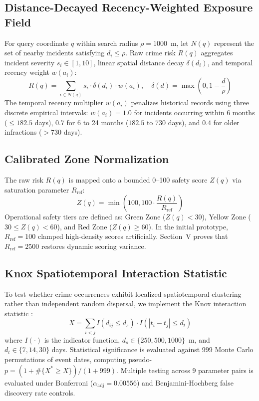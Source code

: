 \documentclass[conference]{IEEEtran}
\begin{document}
\subsection{Distance-Decayed Recency-Weighted Exposure Field}
For query coordinate $q$ within search radius $\rho = 1000$~m, let $N(q)$ represent the set of nearby incidents satisfying $d_i \le \rho$. Raw crime risk $R(q)$ aggregates incident severity $s_i \in [1, 10]$, linear spatial distance decay $\delta(d_i)$, and temporal recency weight $w(a_i)$:
\begin{equation}
R(q) = \sum_{i \in N(q)} s_i \cdot \delta(d_i) \cdot w(a_i), \quad \delta(d) = \max\left(0, 1 - \frac{d}{\rho}\right)
\label{eq:raw_risk}
\end{equation}
The temporal recency multiplier $w(a_i)$ penalizes historical records using three discrete empirical intervals: $w(a_i) = 1.0$ for incidents occurring within 6 months ($\le 182.5$ days), $0.7$ for 6 to 24 months ($182.5$ to $730$ days), and $0.4$ for older infractions ($> 730$ days).

\subsection{Calibrated Zone Normalization}
The raw risk $R(q)$ is mapped onto a bounded 0--100 safety score $Z(q)$ via saturation parameter $R_{\text{ref}}$:
\begin{equation}
Z(q) = \min\left(100, 100 \cdot \frac{R(q)}{R_{\text{ref}}}\right)
\label{eq:zone_score}
\end{equation}
Operational safety tiers are defined as: Green Zone ($Z(q) < 30$), Yellow Zone ($30 \le Z(q) < 60$), and Red Zone ($Z(q) \ge 60$). In the initial prototype, $R_{\text{ref}} = 100$ clamped high-density scores artificially. Section~V proves that $R_{\text{ref}} = 2500$ restores dynamic scoring variance.

\subsection{Knox Spatiotemporal Interaction Statistic}
To test whether crime occurrences exhibit localized spatiotemporal clustering rather than independent random dispersal, we implement the Knox interaction statistic \cite{knox1964detection}:
\begin{equation}
X = \sum_{i < j} I(d_{ij} \le d_s) \cdot I(|t_i - t_j| \le d_t)
\label{eq:knox}
\end{equation}
where $I(\cdot)$ is the indicator function, $d_s \in \{250, 500, 1000\}$~m, and $d_t \in \{7, 14, 30\}$ days. Statistical significance is evaluated against 999 Monte Carlo permutations of event dates, computing pseudo-$p = (1 + \#\{X^* \ge X\}) / (1 + 999)$. Multiple testing across 9 parameter pairs is evaluated under Bonferroni ($\alpha_{\text{adj}} = 0.00556$) and Benjamini-Hochberg false discovery rate controls.
\end{document}
